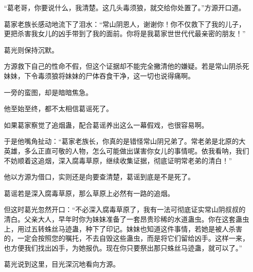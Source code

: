 \begin{this_body}
“葛老哥，你要说什么，我清楚。这几头毒须狼，就交给你处置了。”方源开口道。

葛家老族长感动地流下了泪水：“常山阴恩人，谢谢你！你不仅救下了我的儿子，更把杀害我女儿的凶手带到了我的面前。你将是我葛家世世代代最亲密的朋友！”

葛光则保持沉默。

方源救下自己的性命不假，但这个证据却不能完全撇清他的嫌疑。若是常山阴杀死妹妹，下令毒须狼将妹妹的尸体吞食干净，这一切也说得痛啊。

一旁的蛮图，却是暗暗焦急。

他至始至终，都不太相信葛谣死了。

如果葛家察觉了追烟蛊，配合葛谣养出这么一幕假戏，也很容易啊。

于是他嘴角扯动：“葛家老族长，你真的是错怪常山阴兄弟了。常老弟是北原的大英雄，多么正直可敬的人物，怎么可能做出谋害你女儿的事情呢。依我看呐，我们不妨顺着这追烟，深入腐毒草原，继续收集证据，彻底证明常老弟的清白！”

他以方源为借口，实则还是向要查清楚，葛谣到底是不是死了。

葛谣若是深入腐毒草原，那么草原上必然有一路的追烟。

但这时葛光忽然开口：“不必深入腐毒草原了，我有一法可彻底证实常山阴叔叔的清白。父亲大人，早年时你为妹妹准备了一套昂贵珍稀的水道蛊虫。你在这套蛊虫上，用过五转蛛丝马迹蛊，种下了印记。妹妹也知道这件事情，若她是被人杀害的，一定会按照您的嘱托，不去自毁这些蛊虫，而是将它们留给凶手。这样一来，也方便我们找出凶手，为她报仇。现在你只要祭出那只蛛丝马迹蛊，就可以了。”

葛光说到这里，目光深沉地看向方源。

\end{this_body}

